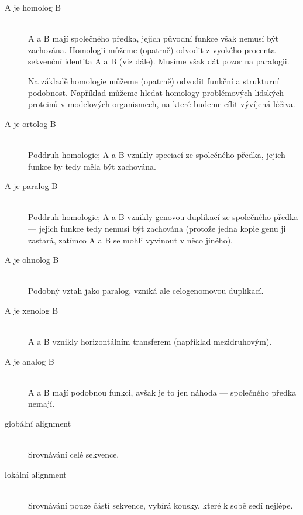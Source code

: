 \documentclass[DIV=8]{scrreprt}
\begin{document}
\begin{description}
\item[A je homolog B]\hfill \\
A a B mají společného předka, jejich původní funkce však nemusí být zachována. Homologii můžeme (opatrně) odvodit z vyokého procenta sekvenční identita A a B (viz dále). Musíme však dát pozor na paralogii.

Na základě homologie můžeme (opatrně) odvodit funkční a strukturní podobnost. Například můžeme hledat homology problémových lidských proteinů v modelových organismech, na které budeme cílit vývíjená léčiva.


\item[A je ortolog B]\hfill \\
Poddruh homologie; A a B vznikly speciací ze společného předka, jejich funkce by tedy měla být zachována.


\item[A je paralog B]\hfill \\
Poddruh homologie; A a B vznikly genovou duplikací ze společného
předka --- jejich funkce tedy nemusí být zachována
(protože jedna kopie genu ji zastará, zatímco A a B se mohli vyvinout v něco jiného).


\item[A je ohnolog B]\hfill \\
Podobný vztah jako paralog, vzniká ale celogenomovou duplikací.


\item[A je xenolog B]\hfill \\
A a B vznikly horizontálním transferem (například mezidruhovým).


\item[A je analog B]\hfill \\
A a B mají podobnou funkci, avšak je to jen náhoda --- společného předka nemají.


\item[globální alignment]\hfill \\
Srovnávání celé sekvence.


\item[lokální alignment]\hfill \\
Srovnávání pouze částí sekvence, vybírá kousky, které k sobě sedí nejlépe.

\end{description}
\end{document}
